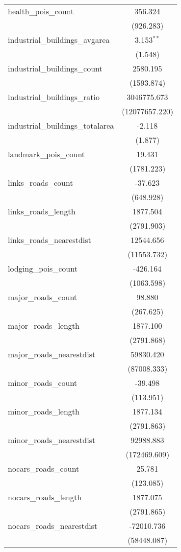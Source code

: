 \begin{table}[!htbp]
\begin{tabular}{@{\extracolsep{5pt}}lc}
 health_pois_count & 356.324$^{}$ \\
  & (926.283) \\
 industrial_buildings_avgarea & 3.153$^{**}$ \\
  & (1.548) \\
 industrial_buildings_count & 2580.195$^{}$ \\
  & (1593.874) \\
 industrial_buildings_ratio & 3046775.673$^{}$ \\
  & (12077657.220) \\
 industrial_buildings_totalarea & -2.118$^{}$ \\
  & (1.877) \\
 landmark_pois_count & 19.431$^{}$ \\
  & (1781.223) \\
 links_roads_count & -37.623$^{}$ \\
  & (648.928) \\
 links_roads_length & 1877.504$^{}$ \\
  & (2791.903) \\
 links_roads_nearestdist & 12544.656$^{}$ \\
  & (11553.732) \\
 lodging_pois_count & -426.164$^{}$ \\
  & (1063.598) \\
 major_roads_count & 98.880$^{}$ \\
  & (267.625) \\
 major_roads_length & 1877.100$^{}$ \\
  & (2791.868) \\
 major_roads_nearestdist & 59830.420$^{}$ \\
  & (87008.333) \\
 minor_roads_count & -39.498$^{}$ \\
  & (113.951) \\
 minor_roads_length & 1877.134$^{}$ \\
  & (2791.863) \\
 minor_roads_nearestdist & 92988.883$^{}$ \\
  & (172469.609) \\
 nocars_roads_count & 25.781$^{}$ \\
  & (123.085) \\
 nocars_roads_length & 1877.075$^{}$ \\
  & (2791.865) \\
 nocars_roads_nearestdist & -72010.736$^{}$ \\
  & (58448.087) \\

\end{tabular}
\end{table}
